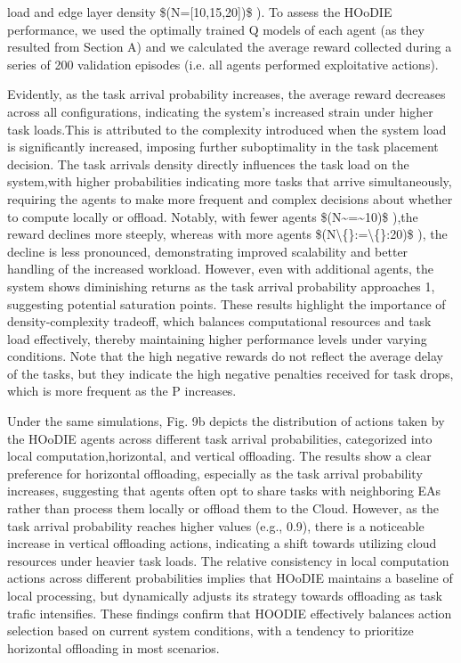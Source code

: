 \documentclass{article}
\begin{document}
load and edge layer density \$(N=[10,15,20])\$ ). To assess the HOoDIE performance, we used the optimally trained Q models of each agent (as they resulted from Section A) and we calculated the average reward collected during a series of 200 validation episodes (i.e. all agents performed exploitative actions).

Evidently, as the task arrival probability increases, the average reward decreases across all configurations, indicating the system's increased strain under higher task loads.This is attributed to the complexity introduced when the system load is significantly increased, imposing further suboptimality in the task placement decision. The task arrivals density directly influences the task load on the system,with higher probabilities indicating more tasks that arrive simultaneously, requiring the agents to make more frequent and complex decisions about whether to compute locally or offload. Notably, with fewer agents \$(N\textasciitilde{}=\textasciitilde{}10)\$ ),the reward declines more steeply, whereas with more agents \$(N\textbackslash\{\}:=\textbackslash\{\}:20)\$ ), the decline is less pronounced, demonstrating improved scalability and better handling of the increased workload. However, even with additional agents, the system shows diminishing returns as the task arrival probability approaches 1, suggesting potential saturation points. These results highlight the importance of density-complexity tradeoff, which balances computational resources and task load effectively, thereby maintaining higher performance levels under varying conditions. Note that the high negative rewards do not reflect the average delay of the tasks, but they indicate the high negative penalties received for task drops, which is more frequent as the P increases.

Under the same simulations, Fig. 9b depicts the distribution of actions taken by the HOoDIE agents across different task arrival probabilities, categorized into local computation,horizontal, and vertical offloading. The results show a clear preference for horizontal offloading, especially as the task arrival probability increases, suggesting that agents often opt to share tasks with neighboring EAs rather than process them locally or offload them to the Cloud. However, as the task arrival probability reaches higher values (e.g., 0.9), there is a noticeable increase in vertical offloading actions, indicating a shift towards utilizing cloud resources under heavier task loads. The relative consistency in local computation actions across different probabilities implies that HOoDIE maintains a baseline of local processing, but dynamically adjusts its strategy towards offloading as task trafic intensifies. These findings confirm that HOODIE effectively balances action selection based on current system conditions, with a tendency to prioritize horizontal offloading in most scenarios.
\end{document}
